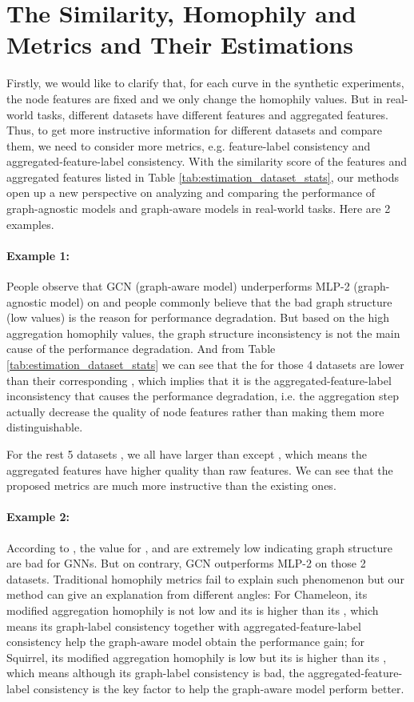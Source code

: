 \documentclass{article}
\newcommand{\0}{{\boldsymbol{0}}}
\newcommand{\6}{{\partial}}
\newcommand{\8}{{\infty}}
\newcommand{\4}{{\nabla}}
\begin{document}
\section{The Similarity, Homophily and  Metrics and Their Estimations}
\label{appendix:estimation_similarity_homophily_diversification_metrics}
Firstly, we would like to clarify that, for each curve in the synthetic experiments, the node features are fixed and we only change the homophily values. But in real-world tasks, different datasets have different features and aggregated features. Thus, to get more instructive information for different datasets and compare them, we need to consider more metrics, e.g. feature-label consistency and aggregated-feature-label consistency. With the similarity score of the features  and aggregated features  listed in Table \ref{tab:estimation_dataset_stats}, our methods open up a new perspective on analyzing and comparing the performance of graph-agnostic models and graph-aware models in real-world tasks. Here are 2 examples.

\paragraph{Example 1:} People observe that GCN (graph-aware model) underperforms MLP-2 (graph-agnostic model) on  and people commonly believe that the bad graph structure (low  values) is the reason for performance degradation. But based on the high aggregation homophily values, the graph structure inconsistency is not the main cause of the performance degradation. And from Table \ref{tab:estimation_dataset_stats} we can see that the  for those 4 datasets are lower than their corresponding , which implies that it is the aggregated-feature-label inconsistency that causes the performance degradation, i.e. the aggregation step actually decrease the quality of node features rather than making them more distinguishable.

For the rest 5 datasets , we all have  larger than  except , which means the aggregated features have higher quality than raw features. We can see that the proposed metrics are much more instructive than the existing ones.

\paragraph{Example 2:} According to , the value for , and  are extremely low indicating graph structure are bad for GNNs. But on contrary, GCN outperforms MLP-2 on those 2 datasets. Traditional homophily metrics fail to explain such phenomenon but our method can give an explanation from different angles: For Chameleon, its modified aggregation homophily is not low and its  is higher than its , which means its graph-label consistency together with aggregated-feature-label consistency help the graph-aware model obtain the performance gain; for Squirrel, its modified aggregation homophily is low but its  is higher than its , which means although its graph-label consistency is bad, the aggregated-feature-label consistency is the key factor to help the graph-aware model perform better.
\end{document}
